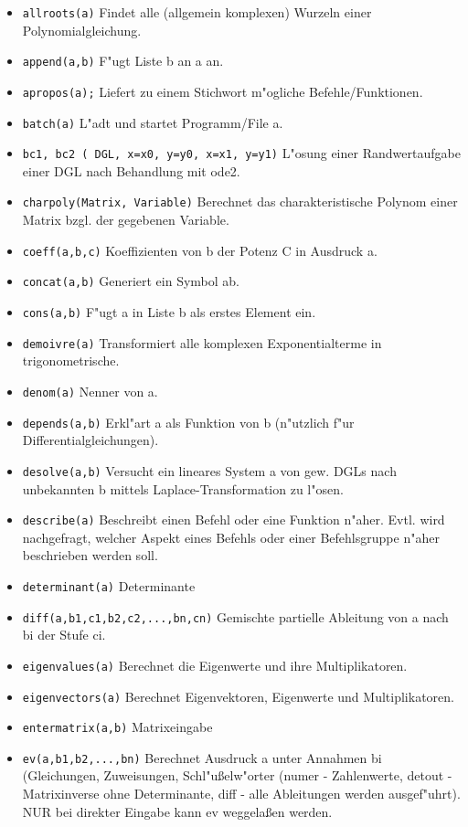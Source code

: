 \documentclass[spanish,12pt,a4paper]{article}
\begin{document}
\begin{itemize}
\item \verb|allroots(a)| Findet alle (allgemein komplexen) Wurzeln einer Polynomialgleichung.
\item \verb|append(a,b)| F"ugt Liste b an a an.
\item \verb|apropos(a);| Liefert zu einem Stichwort m"ogliche Befehle/Funktionen.
\item \verb|batch(a)| L"adt und startet Programm/File a.
\item \verb|bc1, bc2 ( DGL, x=x0, y=y0, x=x1, y=y1)| L"osung einer Randwertaufgabe einer DGL nach Behandlung mit ode2.
\item \verb|charpoly(Matrix, Variable)| Berechnet das charakteristische Polynom einer Matrix bzgl. der gegebenen Variable.
\item \verb|coeff(a,b,c)| Koeffizienten von b der Potenz C in Ausdruck a.
\item \verb|concat(a,b)| Generiert ein Symbol ab.
\item \verb|cons(a,b)| F"ugt a in Liste b als erstes Element ein.
\item \verb|demoivre(a)| Transformiert alle komplexen Exponentialterme in trigonometrische.
\item \verb|denom(a)| Nenner von a.
\item \verb|depends(a,b)| Erkl"art a als Funktion von b (n"utzlich f"ur Differentialgleichungen).
\item \verb|desolve(a,b)| Versucht ein lineares System a von gew. DGLs nach unbekannten b mittels Laplace-Transformation zu l"osen.
\item \verb|describe(a)| Beschreibt einen Befehl oder eine Funktion n"aher. Evtl. wird nachgefragt, welcher Aspekt eines Befehls oder einer Befehlsgruppe n"aher beschrieben werden soll.
\item \verb|determinant(a)| Determinante
\item \verb|diff(a,b1,c1,b2,c2,...,bn,cn)| Gemischte partielle Ableitung von a nach bi der Stufe ci.
\item \verb|eigenvalues(a)| Berechnet die Eigenwerte und ihre Multiplikatoren.
\item \verb|eigenvectors(a)| Berechnet Eigenvektoren, Eigenwerte und Multiplikatoren.
\item \verb|entermatrix(a,b)| Matrixeingabe
\item \verb|ev(a,b1,b2,...,bn)| Berechnet Ausdruck a unter Annahmen bi (Gleichungen, Zuweisungen, Schl"u{\ss}elw"orter (numer - Zahlenwerte, detout - Matrixinverse ohne Determinante, diff - alle Ableitungen werden ausgef"uhrt). NUR bei direkter Eingabe kann ev weggela{\ss}en werden.

\end{itemize}
\end{document}
